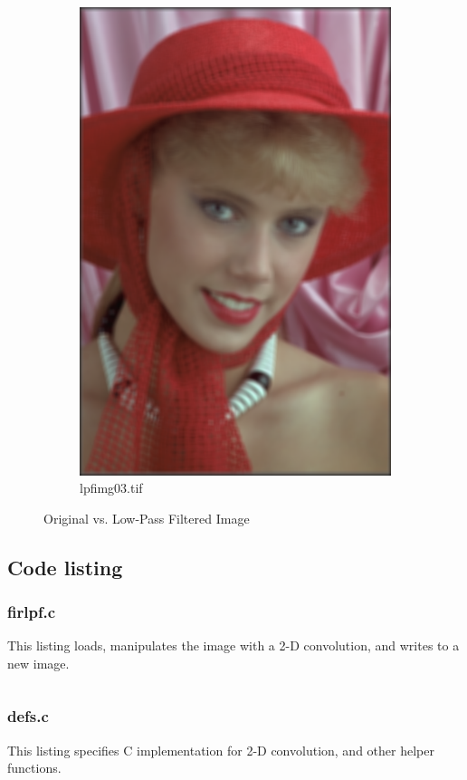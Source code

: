 \documentclass{article}
\begin{document}
\begin{figure}[h]
\begin{subfigure}{0.5\textwidth}
\includegraphics[width=0.9\linewidth, right]{firlpf}
\caption{lpfimg03.tif}
\end{subfigure}
\caption{Original vs. Low-Pass Filtered Image}
\end{figure}

\subsection{Code listing}
\subsubsection{firlpf.c}
This listing loads, manipulates the image with a 2-D convolution, and writes to a new image.
\inputminted[tabsize=4]{c}{firlpf.c}
\subsubsection{defs.c}
This listing specifies C implementation for 2-D convolution, and other helper functions.
\inputminted[tabsize=4]{c}{defs.c}
\end{document}
